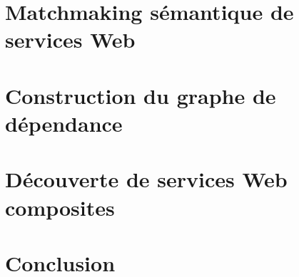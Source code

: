 

\newpage
\section{Matchmaking sémantique de services Web}
\label{sec:ch3/matching}


\section{Construction du graphe de dépendance}
\label{sec:ch3/graph}

\section{Découverte de services Web composites}
\label{sec:ch3/composition}

\section*{Conclusion}
\label{sec:ch3/conclusion}
 


